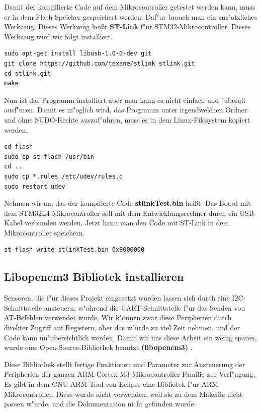 Damit der kompilierte Code auf dem Mikrocontroller getestet werden kann, muss er in dem Flash-Speicher gespeichert werden. Daf"ur brauch man ein zus"atzliches Werkzeug. Dieses Werkzeug hei\ss{}t \textbf{ST-Link} f"ur STM32-Mikrocontroller. Dieses Werkzeug wird wie folgt installiert.

\begin{lstlisting}[frame=single]
sudo apt-get install libusb-1.0-0-dev git
git clone https://github.com/texane/stlink stlink.git
cd stlink.git
make
\end{lstlisting}
Nun ist das Programm installiert aber man kann es nicht einfach und "uberall ausf"uren. Damit es m"oglich wird, das Programm unter irgendwelchen Ordner und ohne SUDO-Rechte auszuf"uhren, muss es in dem Linux-Filesystem kopiert werden.
\begin{lstlisting}[frame=single]
cd flash
sudo cp st-flash /usr/bin
cd ..
sudo cp *.rules /etc/udev/rules.d
sudo restart udev
\end{lstlisting}

Nehmen wir an, das der kompilierte Code \textbf{stlinkTest.bin} hei\ss{}t. Das Board mit dem STM32L4-Mikrocontroller soll mit dem Entwicklungsrechner durch ein USB-Kabel  verbunden werden. Jetzt kann man den Code mit ST-Link in dem Mikrocontroller speichern. 
\begin{lstlisting}[frame=single]
st-flash write stlinkTest.bin 0x8000000
\end{lstlisting}

\subsection{Libopencm3 Bibliotek installieren}
Sensoren, die f"ur dieses Projekt eingesetzt wurden lassen sich durch 
eine I2C-Schnittstelle ansteuern, w"ahrend die UART-Schnittstelle f"ur 
das Senden von AT-Befehlen verwendet wurde. Wir k"onnen zwar diese 
Peripherien durch direkter Zugriff auf Registern, aber das w"urde zu 
viel Zeit nehmen, und der Code kann un"ubersichtlich werden. Damit wir 
uns diese Arbeit ein wenig sparen, wurde eine Open-Source-Bibliothek 
benutzt \textbf{(libopencm3)} \cite{lib}. 

Diese Bibliothek stellt fertige Funktionen und Parameter zur 
Ansteuerung der Peripherien der ganzen 
ARM-Cortex-M3-Mikrocontroller-Familie zur Verf"ugung. 
Es gibt in dem GNU-ARM-Tool von Eclipse eine Bibliotek f"ur ARM-Mikrocontroller.
Diese wurde nicht verwenden, weil sie zu dem Makefile nicht 
passen w"urde, und die Dokumentation nicht gefunden wurde. 

